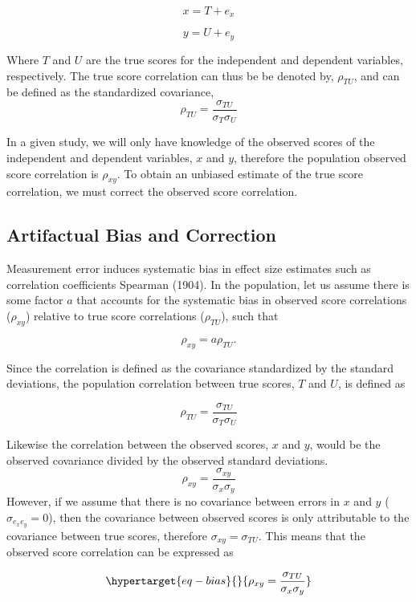 \documentclass[
  letterpaper,
  DIV=11,
  numbers=noendperiod]{scrreprt}
\begin{document}
\[
x=T+e_x
\]

\[
y=U+e_y
\]

Where \(T\) and \(U\) are the true scores for the independent and
dependent variables, respectively. The true score correlation can thus
be be denoted by, \(\rho_{TU}\), and can be defined as the standardized
covariance, \[
\rho_{TU} = \frac{\sigma_{TU}}{\sigma_{T}\sigma_{U}}
\]

In a given study, we will only have knowledge of the observed scores of
the independent and dependent variables, \(x\) and \(y\), therefore the
population observed score correlation is \(\rho_{xy}\). To obtain an
unbiased estimate of the true score correlation, we must correct the
observed score correlation.

\hypertarget{sec-r-corr}{%
\subsection{Artifactual Bias and Correction}\label{sec-r-corr}}

Measurement error induces systematic bias in effect size estimates such
as correlation coefficients Spearman (1904). In the population, let us
assume there is some factor \(a\) that accounts for the systematic bias
in observed score correlations (\(\rho_{xy}\)) relative to true score
correlations (\(\rho_{TU}\)), such that

\[
\rho_{xy} = a \rho_{TU}.
\]

Since the correlation is defined as the covariance standardized by the
standard deviations, the population correlation between true scores,
\(T\) and \(U\), is defined as

\[
\rho_{TU}=\frac{\sigma_{TU}}{\sigma_{T} \sigma_{U}}
\]

Likewise the correlation between the observed scores, \(x\) and \(y\),
would be the observed covariance divided by the observed standard
deviations. \[
\rho_{xy} =\frac{\sigma_{xy}}{\sigma_{x} \sigma_{y}}
\] However, if we assume that there is no covariance between errors in
\(x\) and \(y\) (\(\sigma_{e_x e_y} = 0\)), then the covariance between
observed scores is only attributable to the covariance between true
scores, therefore \(\sigma_{xy} = \sigma_{TU}\). This means that the
observed score correlation can be expressed as

\begin{equation}\protect\hypertarget{eq-bias}{}{
\rho_{xy} =\frac{\sigma_{TU}}{\sigma_{x} \sigma_{y}}
}\label{eq-bias}\end{equation}
\end{document}
